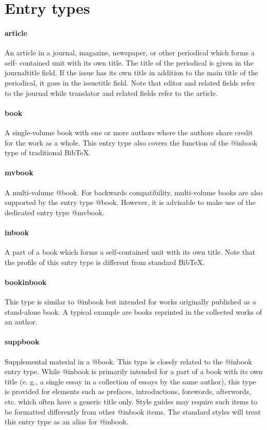 \documentclass[a4paper,12pt]{report}
\begin{document}
\section{Entry types}

\paragraph{article}
An article in a journal, magazine, newspaper, or other periodical which forms a self-
contained unit with its own title. The title of the periodical is given in the journaltitle
field. If the issue has its own title in addition to the main title of the periodical, it goes in the
issuetitle field. Note that editor and related fields refer to the journal while translator
and related fields refer to the article.

\paragraph{book}
A single-volume book with one or more authors where the authors share credit for the
work as a whole. This entry type also covers the function of the @inbook type of traditional
BibTeX.

\paragraph{mvbook}
A multi-volume @book. For backwards compatibility, multi-volume books are also supported
by the entry type @book. However, it is advisable to make use of the dedicated entry type @mvbook.

\paragraph{inbook}
A part of a book which forms a self-contained unit with its own title. Note that the profile
of this entry type is different from standard BibTeX.

\paragraph{bookinbook}
This type is similar to @inbook but intended for works originally published as a stand-alone
book. A typical example are books reprinted in the collected works of an author.

\paragraph{suppbook}
Supplemental material in a @book. This type is closely related to the @inbook entry type.
While @inbook is primarily intended for a part of a book with its own title (e. g., a single
essay in a collection of essays by the same author), this type is provided for elements such
as prefaces, introductions, forewords, afterwords, etc. which often have a generic title only.
Style guides may require such items to be formatted differently from other @inbook items.
The standard styles will treat this entry type as an alias for @inbook.
\end{document}
